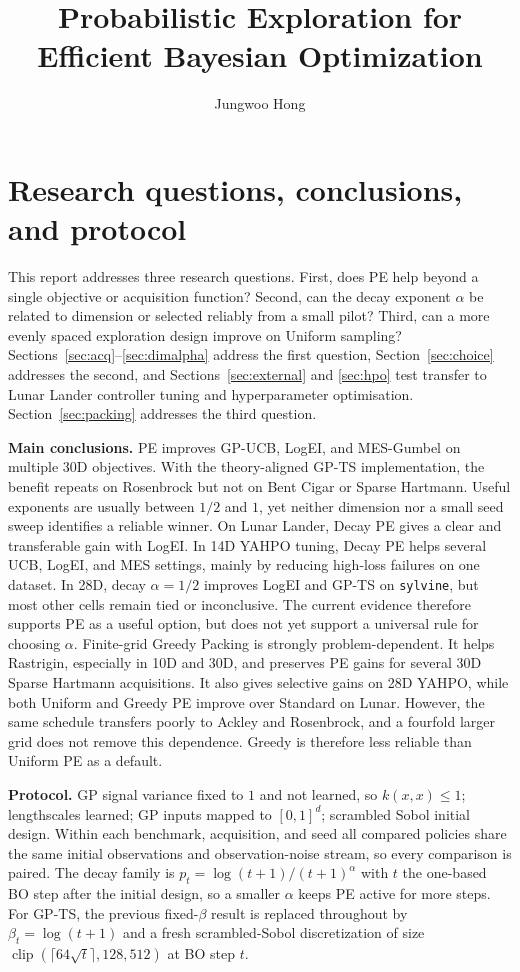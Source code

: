 \documentclass[11pt]{article}
\title{Probabilistic Exploration for Efficient Bayesian Optimization}
\author{Jungwoo Hong}
\date{}
\begin{document}
\maketitle

\section{Research questions, conclusions, and protocol}

This report addresses three research questions. First, does PE help
beyond a single objective or acquisition function? Second, can the decay
exponent $\alpha$ be related to dimension or selected reliably from a small
pilot? Third, can a more evenly spaced exploration design improve on Uniform
sampling? Sections~\ref{sec:acq}--\ref{sec:dimalpha} address the first question,
Section~\ref{sec:choice} addresses the second, and
Sections~\ref{sec:external} and \ref{sec:hpo} test transfer to Lunar Lander
controller tuning and hyperparameter optimisation. Section~\ref{sec:packing}
addresses the third question.

\textbf{Main conclusions.} PE improves GP-UCB, LogEI, and MES-Gumbel on
multiple 30D objectives. With the theory-aligned GP-TS implementation, the
benefit repeats on Rosenbrock but not on Bent Cigar or Sparse Hartmann. Useful exponents are usually between
$1/2$ and $1$, yet neither dimension nor a small seed sweep identifies a
reliable winner. On Lunar Lander, Decay PE gives a clear and transferable gain
with LogEI. In 14D YAHPO tuning, Decay PE helps several UCB, LogEI, and MES
settings, mainly by reducing high-loss failures on one dataset. In 28D, decay
$\alpha=1/2$ improves LogEI and GP-TS on \texttt{sylvine}, but most other cells
remain tied or inconclusive. The current evidence therefore supports PE as a
useful option, but does not yet support a universal rule for choosing $\alpha$.
Finite-grid Greedy Packing is strongly problem-dependent. It helps Rastrigin,
especially in 10D and 30D, and preserves PE gains for several 30D Sparse
Hartmann acquisitions. It also gives selective gains on 28D YAHPO, while both
Uniform and Greedy PE improve over Standard on Lunar. However, the same
schedule transfers poorly to Ackley and Rosenbrock, and a fourfold larger grid
does not remove this dependence. Greedy is therefore less reliable than
Uniform PE as a default.

\textbf{Protocol.} GP signal variance fixed to $1$ and not learned, so
$k(x,x)\le 1$; lengthscales learned; GP inputs mapped to $[0,1]^d$; scrambled
Sobol initial design. Within each benchmark, acquisition, and seed all compared
policies share the same initial observations and observation-noise stream, so
every comparison is paired. The decay family is
$p_t=\log(t+1)/(t+1)^{\alpha}$ with $t$ the one-based BO step after the initial
design, so a smaller $\alpha$ keeps PE active for more steps.
For GP-TS, the previous fixed-$\beta$ result is replaced throughout by
$\beta_t=\log(t+1)$ and a fresh scrambled-Sobol discretization of size
$\operatorname{clip}(\lceil64\sqrt{t}\rceil,128,512)$ at BO step $t$.
\end{document}
